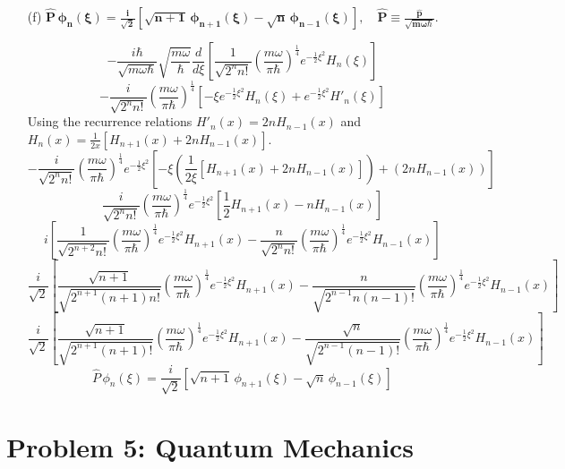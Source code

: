 \documentclass{article}
\begin{document}
{\begin{enumerate}
		\item[(f)] $\bm{ \hat{P} \, \phi_n(\xi) = \frac{i}{\sqrt{2}} \left[ \sqrt{n+1} \, \phi_{n+1}(\xi) - \sqrt{n} \, \phi_{n-1}(\xi) \right], \quad \hat{P} \equiv \frac{\hat{p}}{\sqrt{m\omega\hbar}} .}$
		
		\[
			-\frac{i\hbar}{\sqrt{m\omega\hbar}} \sqrt{\frac{m\omega}{\hbar}} \frac{d}{d\xi} \left[\frac{1}{\sqrt{2^n n!}}\left( \frac{m\omega}{\pi \hbar} \right)^{\frac{1}{4}} e^{-\frac{1}{2}\xi^2} H_n(\xi)\right]
		\]
		\[
			-\frac{i}{\sqrt{2^n n!}}\left( \frac{m\omega}{\pi \hbar} \right)^{\frac{1}{4}} \left[ -\xi e^{-\frac{1}{2}\xi^2} H_n(\xi) + e^{-\frac{1}{2}\xi^2} H'_n(\xi) \right]
		\]
		Using the recurrence relations $H'_n(x) = 2nH_{n-1}(x)$ and $H_n(x) = \frac{1}{2x}\left[ H_{n+1}(x) + 2nH_{n-1}(x) \right]$.
		\[
			-\frac{i}{\sqrt{2^n n!}}\left( \frac{m\omega}{\pi \hbar} \right)^{\frac{1}{4}} e^{-\frac{1}{2}\xi^2} \left[ -\xi\left( \frac{1}{2\xi}\left[ H_{n+1}(x) + 2nH_{n-1}(x) \right] \right) + \left( 2nH_{n-1}(x) \right) \right]
		\]
		\[
			\frac{i}{\sqrt{2^n n!}}\left( \frac{m\omega}{\pi \hbar} \right)^{\frac{1}{4}} e^{-\frac{1}{2}\xi^2} \left[ \frac{1}{2} H_{n+1}(x) - nH_{n-1}(x) \right]
		\]
		\[
			i \left[ \frac{1}{\sqrt{2^{n+2} n!}}\left( \frac{m\omega}{\pi \hbar} \right)^{\frac{1}{4}} e^{-\frac{1}{2}\xi^2} H_{n+1}(x) - \frac{n}{\sqrt{2^n n!}}\left( \frac{m\omega}{\pi \hbar} \right)^{\frac{1}{4}} e^{-\frac{1}{2}\xi^2} H_{n-1}(x) \right]
		\]
		\[
			\frac{i}{\sqrt{2}} \left[ \frac{\sqrt{n+1}}{\sqrt{2^{n+1} (n+1)n!}}\left( \frac{m\omega}{\pi \hbar} \right)^{\frac{1}{4}} e^{-\frac{1}{2}\xi^2} H_{n+1}(x) - \frac{n}{\sqrt{2^{n-1} n(n-1)!}}\left( \frac{m\omega}{\pi \hbar} \right)^{\frac{1}{4}} e^{-\frac{1}{2}\xi^2} H_{n-1}(x) \right]
		\]
		\[
			\frac{i}{\sqrt{2}} \left[ \frac{\sqrt{n+1}}{\sqrt{2^{n+1} (n+1)!}}\left( \frac{m\omega}{\pi \hbar} \right)^{\frac{1}{4}} e^{-\frac{1}{2}\xi^2} H_{n+1}(x) - \frac{\sqrt{n}}{\sqrt{2^{n-1} (n-1)!}}\left( \frac{m\omega}{\pi \hbar} \right)^{\frac{1}{4}} e^{-\frac{1}{2}\xi^2} H_{n-1}(x) \right]
		\]
		\[
			\hat{P} \, \phi_n(\xi) = \frac{i}{\sqrt{2}} \left[ \sqrt{n+1} \, \phi_{n+1}(\xi) - \sqrt{n} \, \phi_{n-1}(\xi) \right]
		\]
		
	\end{enumerate}
	\clearpage
	\section*{Problem 5: Quantum Mechanics}
}
\end{document}
